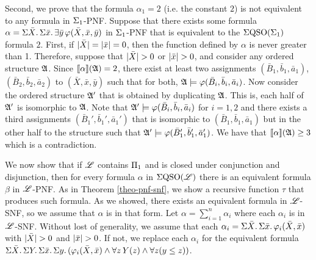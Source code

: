 \vspace{1em}
Second, we prove that the formula $\alpha_{1} = 2$ (i.e. the constant $2$) is not equivalent to any formula in $\Sigma_{1}$-PNF. Suppose that there exists some formula $\alpha = \Sigma{\bar{X}}.\,\Sigma{\bar{x}}.\,\exists\bar{y}\, \varphi(\bar{X},\bar{x},\bar{y})$ in $\Sigma_{1}$-PNF that is equivalent to the $\Sigma{\rm QSO}(\Sigma_{1})$ formula $2$. 
First, if $\vert \bar{X} \vert = \vert \bar{x} \vert = 0$, then the function defined by $\alpha$ is never greater than 1. 
Therefore, suppose that $\vert \bar{X} \vert > 0$ or $\vert \bar{x} \vert > 0$, and consider any ordered structure $\mathfrak{A}$. 
Since ${\llbracket{}{\alpha}\rrbracket}(\mathfrak{A}) = 2$, there exist at least two assignments $(\bar{B}_1,\bar{b}_1,\bar{a}_1)$, $(\bar{B}_2,\bar{b}_2,\bar{a}_2)$ to $(\bar{X},\bar{x},\bar{y})$ such that for both, $\mathfrak{A}\models\varphi(\bar{B}_i,\bar{b}_i,\bar{a}_i)$. Now consider the ordered structure $\mathfrak{A}'$ that is obtained by duplicating $\mathfrak{A}$. This is, each half of $\mathfrak{A}'$ is isomorphic to $\mathfrak{A}$. Note that $\mathfrak{A}'\models\varphi(\bar{B}_i,\bar{b}_i,\bar{a}_i)$ for $i = 1,2$ and there exists a third assignments $(\bar{B}_1',\bar{b}_1',\bar{a}_1')$ that is isomorphic to $(\bar{B}_1,\bar{b}_1,\bar{a}_1)$ but in the other half to the structure such that $\mathfrak{A}'\models\varphi(\bar{B}_1',\bar{b}_1',\bar{a}_1')$. We have that ${\llbracket{}{\alpha}\rrbracket}(\mathfrak{A}) \geq 3$ which is a contradiction.

\vspace{1em}
We now show that if $\mathscr{L}$ contains $\Pi_{1}$ and is closed under conjunction and disjunction, then for every formula $\alpha$ in $\Sigma{\rm QSO}(\mathscr{L})$ there is an equivalent formula $\beta$ in $\mathscr{L}$-PNF. As in Theorem \ref{theo-pnf-snf}, we show a recursive function $\tau$ that produces such formula. As we showed, there exists an equivalent formula in $\mathscr{L}$-SNF, so we assume that $\alpha$ is in that form. Let $\alpha = \sum_{i = 1}^n \alpha_i$ where each $\alpha_i$ is in $\mathscr{L}$-SNF. 
Without lost of generality, we assume that each $\alpha_i = \Sigma{\bar{X}}.\,\Sigma{\bar{x}}.\,\varphi_i(\bar{X},\bar{x})$ with $\vert \bar{X} \vert > 0$ and $\vert \bar{x} \vert > 0$. If not, we replace each $\alpha_i$ for the equivalent formula $\Sigma{\bar{X}}.\, \Sigma{Y}.\,\Sigma{\bar{x}}.\,\Sigma{y}.\,(\varphi_i(\bar{X},\bar{x})\wedge\forall z\,Y(z) \wedge \forall z(y \leq z))$.


